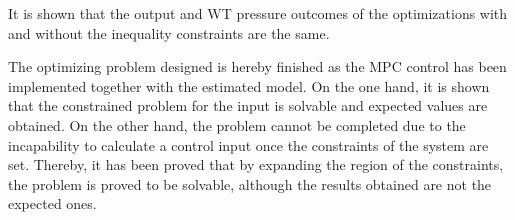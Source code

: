 It is shown that the output and WT pressure outcomes of the optimizations with and without the inequality constraints are the same. 


The optimizing problem designed is hereby finished as the MPC control has been implemented together with the estimated model. On the one hand, it is shown that the constrained problem for the input is solvable and expected values are obtained. On the other hand, the problem cannot be completed due to the incapability to calculate a control input once the constraints of the system are set. Thereby, it has been proved that by expanding the region of the constraints, the problem is proved to be solvable, although the results obtained are not the expected ones. 
